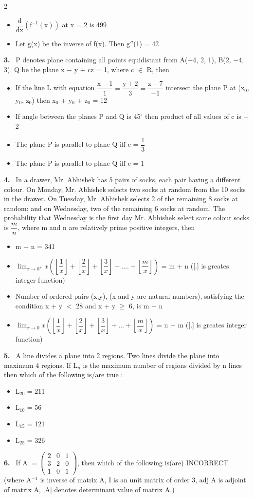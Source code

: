 \documentclass[10pt]{extarticle}
\newcommand{\qn}[1]{\par\smallskip\noindent\textbf{#1.}~}
\newenvironment{qoptions}{\begin{itemize}[leftmargin=1.8em,itemsep=1pt,topsep=2pt,label={}]}{\end{itemize}}
\newcommand{\opt}[2]{\item[(#1)] #2}
\begin{document}
\begin{multicols}{2}
\begin{qoptions}
\opt{C}{$\dfrac{\mathrm d}{\mathrm{dx}}\left(\mathrm f^{-1}(\mathrm x)\right)$ at x = 2 is 499}
\opt{D}{Let g(x) be the inverse of f(x). Then g$''$(1) = 42}
\end{qoptions}
\qn{3} P denotes plane containing all points equidistant from A($-$4, 2, 1), B(2, $-$4, 3). Q be the plane x $-$ y + cz = 1, where c $\in$ R, then
\begin{qoptions}
\opt{A}{If the line L with equation $\dfrac{\mathrm x-1}1=\dfrac{\mathrm y+2}3=\dfrac{\mathrm z-7}{-1}$ intersect the plane P at (x$_0$, y$_0$, z$_0$) then x$_0$ + y$_0$ + z$_0$ = 12}
\opt{B}{If angle between the planes P and Q is 45$^\circ$ then product of all values of c is $-$2}
\opt{C}{The plane P is parallel to plane Q iff c = $\dfrac13$}
\opt{D}{The plane P is parallel to plane Q iff c = 1}
\end{qoptions}
\qn{4} In a drawer, Mr. Abhishek has 5 pairs of socks, each pair having a different colour. On Monday, Mr. Abhishek selects two socks at random from the 10 socks in the drawer. On Tuesday, Mr. Abhishek selects 2 of the remaining 8 socks at random; and on Wednesday, two of the remaining 6 socks at random. The probability that Wednesday is the first day Mr. Abhishek select same colour socks is $\dfrac mn$, where m and n are relatively prime positive integers, then
\begin{qoptions}
\opt{A}{m + n = 341}
\opt{B}{$\displaystyle\lim_{x\to0^+}x\left(\left[\dfrac1x\right]+\left[\dfrac2x\right]+\left[\dfrac3x\right]+....+\left[\dfrac mx\right]\right)$ = m + n ([.] is greates integer function)}
\opt{C}{Number of ordered pairs (x,y), (x and y are natural numbers), satisfying the condition x + y $<$ 28 and x + y $\ge$ 6, is m + n}
\opt{D}{$\displaystyle\lim_{x\to0}x\left(\left[\dfrac1x\right]+\left[\dfrac2x\right]+\left[\dfrac3x\right]+...+\left[\dfrac mx\right]\right)$ = n $-$ m ([.] is greates integer function)}
\end{qoptions}
\qn{5} A line divides a plane into 2 regions. Two lines divide the plane into maximum 4 regions. If L$_n$ is the maximum number of regions divided by n lines then which of the following is/are true :
\begin{qoptions}
\opt{A}{L$_{20}$ = 211}
\opt{B}{L$_{10}$ = 56}
\opt{C}{L$_{15}$ = 121}
\opt{D}{L$_{25}$ = 326}
\end{qoptions}
\qn{6} If A $=\begin{pmatrix}2&0&1\\3&2&0\\1&0&1\end{pmatrix}$, then which of the following is(are) INCORRECT (where A$^{-1}$ is inverse of matrix A, I is an unit matrix of order 3, adj A is adjoint of matrix A, $|$A$|$ denotes determinant value of matrix A.)

\end{multicols}
\end{document}
